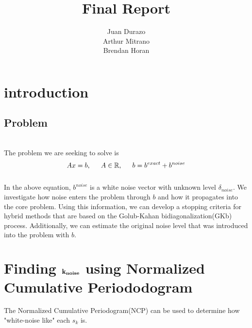 \documentclass[11pt]{amsart}
\title{Final Report}
\author{Juan Durazo \\ Arthur Mitrano \\ Brendan Horan}
\begin{document}
\maketitle
\section{ introduction}
\subsection{Problem} \indent \\
The problem we are seeking to solve is 
$$Ax=b, \indent A  \in  \mathbb{R}, \indent b = b^{exact} + b^{noise}$$ \\
In the above equation, $b^{noise}$ is a white noise vector with unknown level $\delta_{noise}$.
We investigate how noise enters the problem through $b$ and how it propagates into the 
core problem. Using this information, we can develop a stopping criteria for hybrid methods 
that are based on the Golub-Kahan bidiagonalization(GKb) process. Additionally, we 
can estimate the original noise level that was introduced into the problem with $b$.

\section{Finding $\bf k_{noise}$ using Normalized Cumulative Periododogram}
The Normalized Cumulative Periodogram(NCP) can be used to determine how "white-noise like" 
each $s_k$ is.
\end{document}
